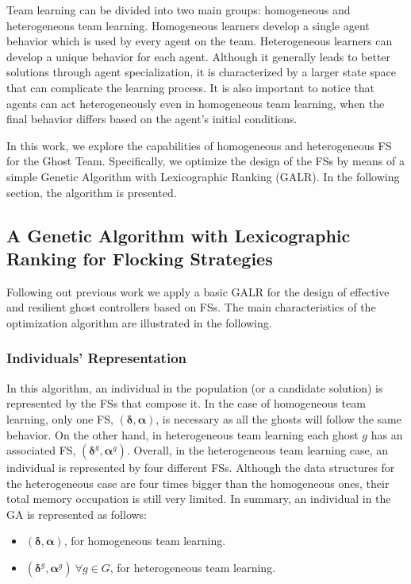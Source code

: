 \documentclass[journal]{IEEEtran}
\begin{document}
Team learning can be divided into two main groups: homogeneous and
heterogeneous team learning. Homogeneous learners develop a single
agent behavior which is used by every agent on the team. Heterogeneous
learners can develop a unique behavior for each agent. Although it
generally leads to better solutions through agent specialization, it
is characterized by a larger state space that can complicate the learning process. It is also
 important to notice that agents can act heterogeneously even in
 homogeneous team learning, when the final behavior differs based on
 the agent's initial conditions. 

In this work, we explore the capabilities of homogeneous and heterogeneous FS for the Ghost Team. Specifically, we optimize the design of the FSs by means of a simple Genetic
Algorithm with Lexicographic Ranking (GALR). In the following section, the algorithm is presented.

\subsection{A Genetic Algorithm with Lexicographic Ranking for Flocking Strategies}
Following out previous work \cite{Liberatore2014} we apply a basic GALR for the design of effective and resilient ghost controllers based on FSs. The main characteristics of the optimization algorithm are illustrated in the following.

\subsubsection{Individuals' Representation}
In this algorithm, an individual in the population (or a candidate solution) is represented by the FSs that compose it. In the case of homogeneous team learning, only one FS, $(\boldsymbol\delta, \boldsymbol\alpha)$, is necessary as all the ghosts will follow the same behavior. On the other hand, in heterogeneous team learning each ghost $g$ has an associated FS, $(\boldsymbol\delta^g,  \boldsymbol\alpha^g)$. Overall, in the heterogeneous team learning case, an individual is represented by four different FSs. Although the data structures for the heterogeneous case are four times bigger than the homogeneous ones, their total memory occupation is still very limited. In summary, an individual in the GA is represented as follows:

\begin{itemize}
  \item $(\boldsymbol\delta, \boldsymbol\alpha)$, for homogeneous team learning.
  \item $(\boldsymbol\delta^g, \boldsymbol\alpha^g)\: \forall g \in G$, for heterogeneous team learning.
\end{itemize}
\end{document}

